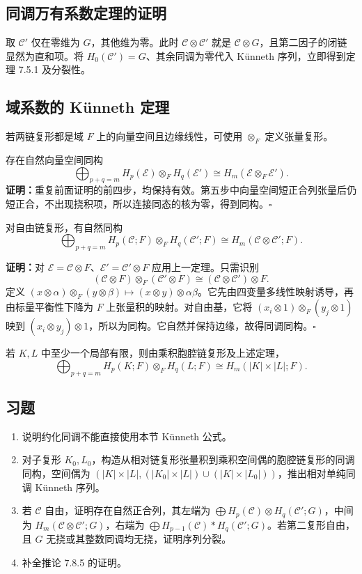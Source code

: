 \subsection*{同调万有系数定理的证明}
取 $\mathcal C'$ 仅在零维为 $G$，其他维为零。此时 $\mathcal C\otimes\mathcal C'$ 就是 $\mathcal C\otimes G$，且第二因子的闭链显然为直和项。将 $H_0(\mathcal C')=G$、其余同调为零代入 Künneth 序列，立即得到定理 7.5.1 及分裂性。

\subsection*{域系数的 Künneth 定理}
若两链复形都是域 $F$ 上的向量空间且边缘线性，可使用 $\otimes_F$ 定义张量复形。

存在自然向量空间同构
\[
\bigoplus_{p+q=m}H_p(\mathcal E)\otimes_FH_q(\mathcal E')\cong H_m(\mathcal E\otimes_F\mathcal E').
\]
\textbf{证明：}重复前面证明的前四步，均保持有效。第五步中向量空间短正合列张量后仍短正合，不出现挠积项，所以连接同态的核为零，得到同构。\hfill$\square$

对自由链复形，有自然同构
\[
\bigoplus_{p+q=m}H_p(\mathcal C;F)\otimes_FH_q(\mathcal C';F)
\cong H_m(\mathcal C\otimes\mathcal C';F).
\]

\textbf{证明：}对 $\mathcal E=\mathcal C\otimes F$、$\mathcal E'=\mathcal C'\otimes F$ 应用上一定理。只需识别
\[
(\mathcal C\otimes F)\otimes_F(\mathcal C'\otimes F)\cong(\mathcal C\otimes\mathcal C')\otimes F.
\]
定义 $(x\otimes\alpha)\otimes_F(y\otimes\beta)\mapsto(x\otimes y)\otimes\alpha\beta$。它先由四变量多线性映射诱导，再由标量平衡性下降为 $F$ 上张量积的映射。对自由基，它将 $(x_i\otimes1)\otimes_F(y_j\otimes1)$ 映到 $(x_i\otimes y_j)\otimes1$，所以为同构。它自然并保持边缘，故得同调同构。\hfill$\square$

若 $K,L$ 中至少一个局部有限，则由乘积胞腔链复形及上述定理，
\[
\bigoplus_{p+q=m}H_p(K;F)\otimes_FH_q(L;F)\cong H_m(|K|\times|L|;F).
\]

\subsection*{习题}
\begin{enumerate}
\item 说明约化同调不能直接使用本节 Künneth 公式。
\item 对子复形 $K_0,L_0$，构造从相对链复形张量积到乘积空间偶的胞腔链复形的同调同构，空间偶为 $(|K|\times|L|,(|K_0|\times|L|)\cup(|K|\times|L_0|))$，推出相对单纯同调 Künneth 序列。
\item 若 $\mathcal C$ 自由，证明存在自然正合列，其左端为 $\bigoplus H_p(\mathcal C)\otimes H_q(\mathcal C';G)$，中间为 $H_m(\mathcal C\otimes\mathcal C';G)$，右端为 $\bigoplus H_{p-1}(\mathcal C)*H_q(\mathcal C';G)$。若第二复形自由，且 $G$ 无挠或其整数同调均无挠，证明序列分裂。
\item 补全推论 7.8.5 的证明。
\end{enumerate}
